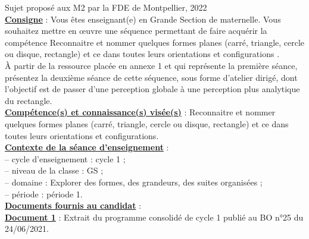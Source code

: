 \activites

\textcolor{G1}{Sujet proposé aux M2 par la FDE de Montpellier, 2022} \\

{\bf\uline{Consigne}} : Vous êtes enseignant(e) en Grande Section de maternelle. Vous souhaitez mettre en œuvre une séquence permettant de faire acquérir la compétence \og Reconnaitre et nommer quelques formes planes (carré, triangle, cercle ou disque, rectangle) et ce dans toutes leurs orientations et configurations \fg. \\
   À partir de la ressource placée en annexe 1 et qui représente la première séance, présentez la deuxième séance de cette séquence, sous forme d’atelier dirigé, dont l’objectif est de passer d’une perception globale à une perception plus analytique du rectangle. \\

{\bf\uline{Compétence(s) et connaissance(s) visée(s)}} : Reconnaitre et nommer quelques formes planes (carré, triangle, cercle ou disque, rectangle) et ce dans toutes leurs orientations et configurations. \\

{\bf\uline{Contexte de la séance d'enseignement}} : \\
   \hspace*{5mm} -- cycle d'enseignement : cycle 1 ; \\
   \hspace*{5mm} -- niveau de la classe : GS ; \\
   \hspace*{5mm} -- domaine : Explorer des formes, des grandeurs, des suites organisées ; \\
   \hspace*{5mm} -- période : période 1. \\ [3mm]
  

{\bf\uline{Documents fournis au candidat}} : \\

{\bf\uline{Document 1}} : Extrait du programme consolidé de cycle 1 publié au BO n°25 du 24/06/2021. \medskip

